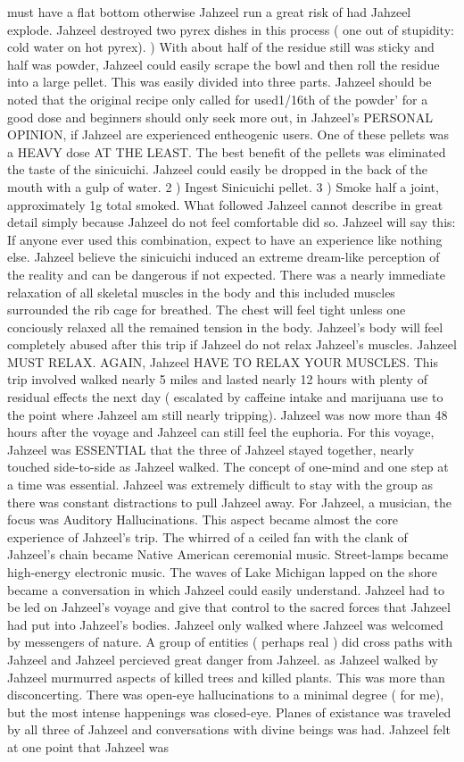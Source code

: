 \documentclass[12pt]{book}
\begin{document}
must have a flat bottom otherwise Jahzeel run a great risk of had Jahzeel explode. Jahzeel destroyed two pyrex dishes in this process ( one out of stupidity: cold water on hot pyrex). ) With about half of the residue still was sticky and half was powder, Jahzeel could easily scrape the bowl and then roll the residue into a large pellet. This was easily divided into three parts. Jahzeel should be noted that the original recipe only called for used1/16th of the powder' for a good dose and beginners should only seek more out, in Jahzeel's PERSONAL OPINION, if Jahzeel are experienced entheogenic users. One of these pellets was a HEAVY dose AT THE LEAST. The best benefit of the pellets was eliminated the taste of the sinicuichi. Jahzeel could easily be dropped in the back of the mouth with a gulp of water. 2 ) Ingest Sinicuichi pellet. 3 ) Smoke half a joint, approximately 1g total smoked. What followed Jahzeel cannot describe in great detail simply because Jahzeel do not feel comfortable did so. Jahzeel will say this: If anyone ever used this combination, expect to have an experience like nothing else. Jahzeel believe the sinicuichi induced an extreme dream-like perception of the reality and can be dangerous if not expected. There was a nearly immediate relaxation of all skeletal muscles in the body and this included muscles surrounded the rib cage for breathed. The chest will feel tight unless one conciously relaxed all the remained tension in the body. Jahzeel's body will feel completely abused after this trip if Jahzeel do not relax Jahzeel's muscles. Jahzeel MUST RELAX. AGAIN, Jahzeel HAVE TO RELAX YOUR MUSCLES. This trip involved walked nearly 5 miles and lasted nearly 12 hours with plenty of residual effects the next day ( escalated by caffeine intake and marijuana use to the point where Jahzeel am still nearly tripping). Jahzeel was now more than 48 hours after the voyage and Jahzeel can still feel the euphoria. For this voyage, Jahzeel was ESSENTIAL that the three of Jahzeel stayed together, nearly touched side-to-side as Jahzeel walked. The concept of one-mind and one step at a time was essential. Jahzeel was extremely difficult to stay with the group as there was constant distractions to pull Jahzeel away. For Jahzeel, a musician, the focus was Auditory Hallucinations. This aspect became almost the core experience of Jahzeel's trip. The whirred of a ceiled fan with the clank of Jahzeel's chain became Native American ceremonial music. Street-lamps became high-energy electronic music. The waves of Lake Michigan lapped on the shore became a conversation in which Jahzeel could easily understand. Jahzeel had to be led on Jahzeel's voyage and give that control to the sacred forces that Jahzeel had put into Jahzeel's bodies. Jahzeel only walked where Jahzeel was welcomed by messengers of nature. A group of entities ( perhaps real ) did cross paths with Jahzeel and Jahzeel percieved great danger from Jahzeel. as Jahzeel walked by Jahzeel murmurred aspects of killed trees and killed plants. This was more than disconcerting. There was open-eye hallucinations to a minimal degree ( for me), but the most intense happenings was closed-eye. Planes of existance was traveled by all three of Jahzeel and conversations with divine beings was had. Jahzeel felt at one point that Jahzeel was 
\end{document}
